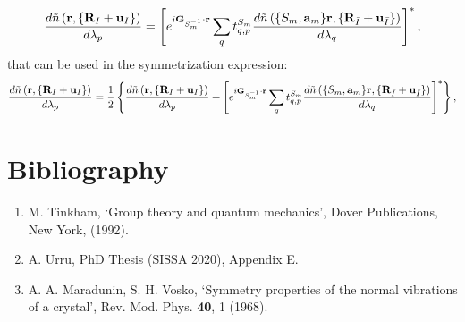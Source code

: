 \documentclass[12pt,a4paper,twoside]{report}
\begin{document}
\begin{equation}
{d \tilde n\left({\bf r}, \{{\bf R}_I + {\bf u}_I\}\right)
\over d \lambda_p} =
\left[
e^{i{\bf G}_{S^{-1}_m} \cdot {\bf r }} \sum_{q} 
t^{S_m}_{q,p}
{d \tilde n\left(\{S_m,{\bf a}_m\} {\bf r}, \{{\bf R}_{\bar I} + {\bf u}_{\bar I}\}\right)
\over d \lambda_q} \right]^*,
\end{equation}
that can be used in the symmetrization expression:
\begin{equation}
{d \tilde n\left({\bf r}, \{{\bf R}_I + {\bf u}_I\}\right)
\over d \lambda_p} ={1\over 2}\left\{
{d \tilde n\left({\bf r}, \{{\bf R}_I + {\bf u}_I\}\right)
\over d \lambda_p}+
\left[
e^{i{\bf G}_{S^{-1}_m} \cdot {\bf r }} \sum_{q} 
t^{S_m}_{q,p}
{d \tilde n\left(\{S_m,{\bf a}_m\} {\bf r}, \{{\bf R}_{\bar I} + {\bf u}_{\bar I}\}\right)
\over d \lambda_q} \right]^* \right\},
\end{equation}


\newpage

{\color{dark-blue}\chapter{Bibliography}}
\color{black}

\begin{enumerate}

\item
M. Tinkham, `Group theory and quantum mechanics', Dover Publications, New York,
(1992). 

\item
A. Urru, PhD Thesis (SISSA 2020), Appendix E.

\item 
A. A. Maradunin, S. H. Vosko, `Symmetry properties of the normal vibrations of a crystal', Rev. Mod. Phys.
{\bf 40}, 1 (1968).
\end{enumerate}
\end{document}
